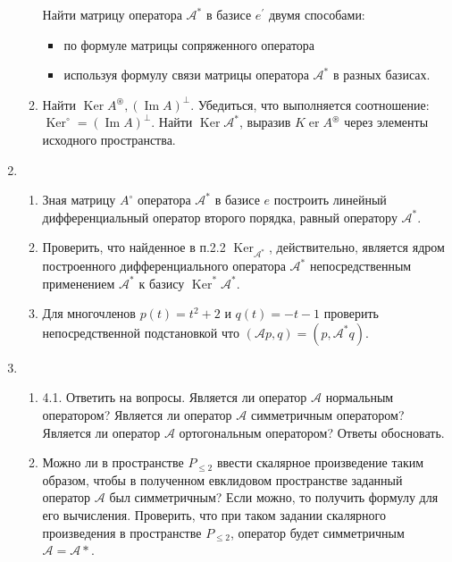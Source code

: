 \documentclass[12pt, a4paper]{article}
\begin{document}
\begin{enumerate}
\begin{enumerate}
            Найти матрицу оператора $\mathcal{A}^{*}$ в базисе $e^{\prime}$ двумя способами:
            \begin{itemize}
                \item по формуле матрицы сопряженного оператора
                \item используя формулу связи матрицы оператора $\mathcal{A}^{*}$ в разных базисах. 
            \end{itemize}
            \item Найти $\operatorname{Ker} A^{\circledast},(\operatorname{Im} A)^{\perp}$. Убедиться, что выполняется соотношение: $\operatorname{Ker}^{\circ}=(\operatorname{Im} A)^{\perp}$. Найти $\operatorname{Ker} \mathcal{A}^{*}$, выразив $K \operatorname{er} A^{\circledast}$ через элементы исходного пространства.        
        \end{enumerate}
        \item \begin{enumerate}
            \item Зная матрицу $A^{\circ}$ оператора $\mathcal{A}^{*}$ в базисе $e$ построить линейный дифференциальный оператор второго порядка, равный оператору $\mathcal{A}^{*}$.
            \item Проверить, что найденное в п.2.2 $\operatorname{Ker}_{\mathcal{A}^{*}}$, действительно, является ядром построенного дифференциального оператора $\mathcal{A}^{*}$ непосредственным применением $\mathcal{A}^{*}$ к базису $\operatorname{Ker}^{*} \mathcal{A}^{*}$.
            \item Для многочленов $p(t)=t^{2}+2$ и $q(t)=-t-1$ проверить непосредственной подстановкой что $(\mathcal{A} p, q)=\left(p, \mathcal{A}^{*} q\right)$.
        \end{enumerate}
        \item \begin{enumerate}
            \item 4.1. Ответить на вопросы. Является ли оператор $\mathcal{A}$ нормальным оператором? Является ли оператор $\mathcal{A}$ симметричным оператором? Является ли оператор $\mathcal{A}$ ортогональным оператором? Ответы обосновать.
            \item Можно ли в пространстве $P_{\leq 2}$ ввести скалярное произведение таким образом, чтобы в полученном евклидовом пространстве заданный оператор $\mathcal{A}$ был симметричным? Если можно, то получить формулу для его вычисления. Проверить, что при таком задании скалярного произведения в пространстве $P_{\leq 2}$, оператор будет симметричным $\mathcal{A}=\mathcal{A} *$.
        \end{enumerate}
    \end{enumerate}
\end{document}
